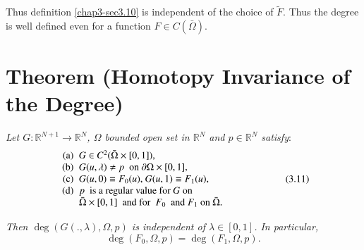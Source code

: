 Thus definition \ref{chap3-sec3.10} is independent of the choice of
$\tilde{F}$. Thus the degree is well defined even for a function $F
\in C(\bar{\Omega})$.  


\section{Theorem (Homotopy Invariance of the
  Degree)}\label{chap3-sec3.11}\pageoriginale%

\textit{Let $G : \mathbb{R}^{N+1} \rightarrow \mathbb{R}^N$, $\Omega$
bounded open set in $\mathbb{R}^N$ and $p \in
\mathbb{R}^N$ satisfy}: 
\begin{equation*}
\begin{array}{r@{\;\;}p{6.5cm}}
\text{(a)} &  $G \in C^2 (\bar{\Omega} \times 
   [0,1])$, \\
\text{(b)} & $G(u, \lambda) \neq p$  \ on\  $\partial \Omega
\times   [0,1]$,\\ 
\text{(c)} & $G(u, 0) \equiv F_0 (u)$, $G(u,1) \equiv F_1(u)$,\\
\text{(d)} & $p$  \ is a regular value for  $G$ on\newline
  $\bar{\Omega} \times  [0,1]$  \ and for \ $F_0$
 \ and\  $F_1$ on $\bar{\Omega}$. 
\end{array}\tag{3.11}\label{chap3-sec3.11-eq3.11}
\end{equation*}

\textit{Then $\deg (G(.,\lambda), \Omega, p)$ is independent
  of $\lambda \in [0,1]$. In particular,} 
$$
\deg (F_0, \Omega , p) = \deg (F_1, \Omega , p). 
$$


